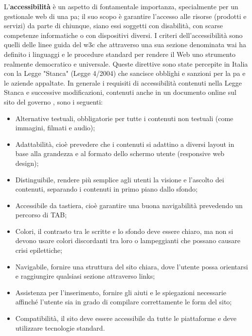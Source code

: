 L'\textbf{accessibilità} è un aspetto di fontamentale importanza, specialmente per un gestionale web di una \Gls{pa}; il suo scopo è garantire l'accesso alle risorse (prodotti e servizi) da parte di chiunque, siano essi soggetti con disabilità, con scarse competenze informatiche o con dispositivi diversi.
I criteri dell'accessibilità sono quelli delle linee guida del \Gls{w3c} che attraverso una sua sezione denominata \Gls{wai} \cite{w3c-wai} ha definito i linguaggi e le procedure standard per rendere il Web uno strumento realmente democratico e universale.
Queste direttive sono state percepite in Italia con la Legge "Stanca" (Legge 4/2004) che sancisce obblighi e sanzioni per la \Gls{pa} e le aziende appaltate.
In generale i requisiti di accessibilità contenuti nella Legge Stanca e successive modificazioni, contenuti anche in un documento online sul sito del governo \cite{agid-access}, sono i seguenti:
\begin{itemize}
    \item Alternative testuali, obbligatorie per tutte i contenuti non testuali (come immagini, filmati e audio);
    \item Adattabilità, cioè prevedere che i contenuti si adattino a diversi layout in base alla grandezza e al formato dello schermo utente (responsive web design);
    \item Distinguibile, rendere più semplice agli utenti la visione e l'ascolto dei contenuti, separando i contenuti in primo piano dallo sfondo;
    \item Accessibile da tastiera, cioè garantire una buona navigabilità prevedendo un percorso di TAB;
    \item Colori, il contrasto tra le scritte e lo sfondo deve essere chiaro, ma non si devono usare colori discordanti tra loro o lampeggianti che possano causare crisi epilettiche;
    \item Navigabile, fornire una struttura del sito chiara, dove l'utente possa orientarsi e raggiungire qualsiasi sezione attraverso links;
    \item Assistenza per l'inserimento, fornire gli aiuti e le spiegazioni necessarie affinché l'utente sia in grado di compilare correttamente le form del sito;
    \item Compatibilità, il sito deve essere accessibile da tutte le piattaforme e deve utilizzare tecnologie standard.
\end{itemize}
